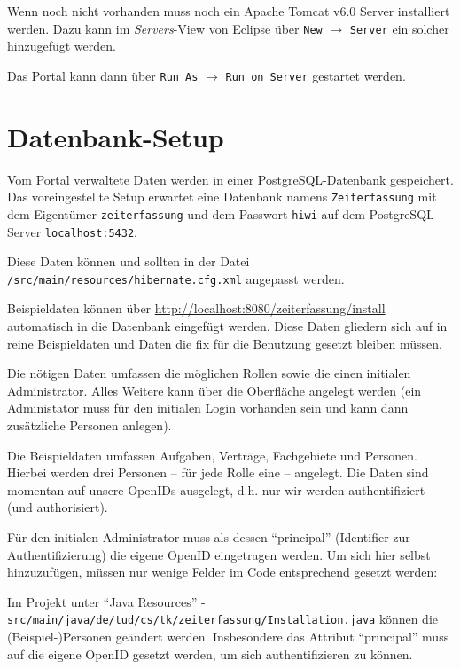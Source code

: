 \documentclass[article,colorback,accentcolor=tud2c]{tudreport}
\begin{document}
Wenn noch nicht vorhanden muss noch ein Apache Tomcat v6.0 Server installiert werden. Dazu kann im \emph{Servers}-View von Eclipse über \texttt{New} $\rightarrow$ \texttt{Server} ein solcher hinzugefügt werden.

Das Portal kann dann über \texttt{Run As} $\rightarrow$ \texttt{Run on Server} gestartet werden.


\section{Datenbank-Setup} %
\label{sec:datenbank_setup}

Vom Portal verwaltete Daten werden in einer PostgreSQL-Datenbank gespeichert. Das voreingestellte Setup erwartet eine Datenbank namens \texttt{Zeiterfassung} mit dem Eigentümer \texttt{zeiterfassung} und dem Passwort \texttt{hiwi} auf dem PostgreSQL-Server \texttt{localhost:5432}.

Diese Daten können und sollten in der Datei \texttt{/src/main/resources/hibernate.cfg.xml} angepasst werden.

Beispieldaten können über \url{http://localhost:8080/zeiterfassung/install} automatisch in die Datenbank eingefügt werden. Diese Daten gliedern sich auf in reine Beispieldaten und Daten die fix für die Benutzung gesetzt bleiben müssen.

Die nötigen Daten umfassen die möglichen Rollen sowie die einen initialen Administrator. Alles Weitere kann über die Oberfläche angelegt werden (ein Administator muss für den initialen Login vorhanden sein und kann dann zusätzliche Personen anlegen).

Die Beispieldaten umfassen Aufgaben, Verträge, Fachgebiete und Personen. Hierbei werden drei Personen -- für jede Rolle eine -- angelegt. Die Daten sind momentan auf unsere OpenIDs ausgelegt, d.h. nur wir werden authentifiziert (und authorisiert). 

Für den initialen Administrator muss als dessen ``principal'' (Identifier zur Authentifizierung) die eigene OpenID eingetragen werden. Um sich hier selbst hinzuzufügen, müssen nur wenige Felder im Code entsprechend gesetzt werden:

Im Projekt unter ``Java Resources'' - \texttt{src/main/java/de/tud/cs/tk/zeiterfassung/Installation.java} können die (Beispiel-)Personen geändert werden. Insbesondere das Attribut ``principal'' muss auf die eigene OpenID gesetzt werden, um sich authentifizieren zu können.
\end{document}
